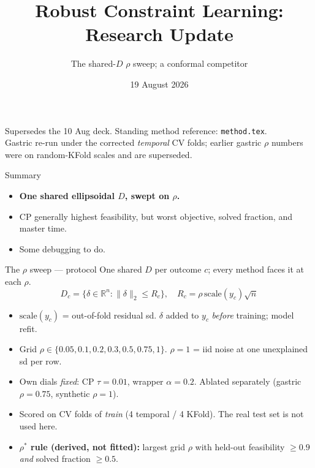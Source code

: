 \documentclass{beamer}
\title{Robust Constraint Learning: Research Update}
\subtitle{The shared-$D$ $\rho$ sweep; a conformal competitor}
\date{19 August 2026}
\begin{document}
\begin{frame}
  \titlepage
  \begin{center}\footnotesize
  Supersedes the 10 Aug deck. Standing method reference: \texttt{method.tex}.\\
  Gastric re-run under the corrected \emph{temporal} CV folds; earlier gastric
  $\rho$ numbers were on random-KFold scales and are superseded.
  \end{center}
\end{frame}

\begin{frame}{Summary}
  \small
  \begin{itemize}
    \item \textbf{One shared ellipsoidal $D$, swept on $\rho$.}
    \item CP generally highest feasibility, but worst objective, solved fraction, and master time.
    \item Some debugging to do.
  \end{itemize}
\end{frame}

\begin{frame}{The $\rho$ sweep --- protocol}
  \small
  One shared $D$ per outcome $c$; every method faces it at each $\rho$.
  \vspace{-0.4em}
  \[
    D_c=\{\delta\in\mathbb{R}^{n}:\|\delta\|_2\le R_c\},\quad
    R_c=\rho\,\mathrm{scale}(y_c)\sqrt{n}
  \]
  \vspace{-1.2em}
  \begin{itemize}
    \item $\mathrm{scale}(y_c)$ = out-of-fold residual sd. $\delta$ added to
      $y_c$ \emph{before} training; model refit.
    \item Grid $\rho\in\{0.05,0.1,0.2,0.3,0.5,0.75,1\}$. $\rho{=}1$ = iid noise
      at one unexplained sd per row.
    \item Own dials \emph{fixed}: CP $\tau{=}0.01$, wrapper $\alpha{=}0.2$.
      Ablated separately (gastric $\rho{=}0.75$, synthetic $\rho{=}1$).
    \item Scored on CV folds of \emph{train} (4 temporal / 4 KFold). The real
      test set is not used here.
    \item \textbf{$\rho^*$ rule (derived, not fitted):} largest grid $\rho$ with
      held-out feasibility $\ge0.9$ \emph{and} solved fraction $\ge0.5$.
  \end{itemize}
\end{frame}
\end{document}
